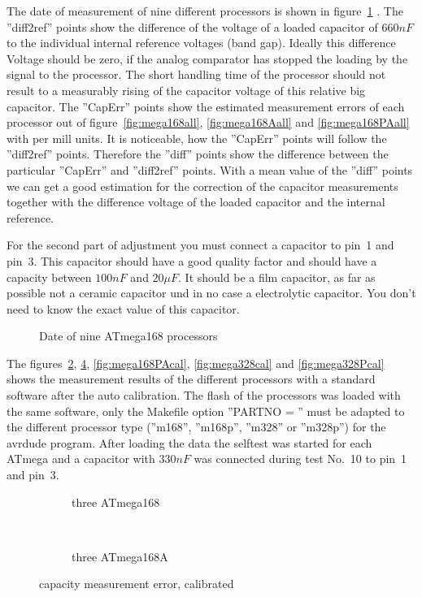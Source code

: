 The date of measurement of nine different processors is shown in figure~\ref{fig:CompAdjust} .
The ''diff2ref'' points show the difference of the voltage of a loaded capacitor of \(660 nF\) to the
individual internal reference voltages (band gap).
Ideally this difference Voltage should be zero, if the analog comparator has stopped the loading by the signal to
the processor. The short handling time of the processor should not result to a measurably rising of the 
capacitor voltage of this relative big capacitor.
The ''CapErr'' points show the estimated measurement errors of each processor out of figure~\ref{fig:mega168all}, \ref{fig:mega168Aall} 
and \ref{fig:mega168PAall} with per mill units.
It is noticeable, how the ''CapErr'' points will follow the ''diff2ref'' points.
Therefore the ''diff'' points show the difference between the particular ''CapErr'' and ''diff2ref'' points.
With a mean value of the ''diff'' points we can get a good estimation for the correction of the capacitor
measurements together with the difference voltage of the loaded capacitor and the internal reference.

For the second part of adjustment you must connect a capacitor to pin~1 and pin~3. This capacitor should have
a good quality factor and should have a capacity between \(100 nF\) and \(20 \mu F\).
It should be a film capacitor, as far as possible not a ceramic capacitor und in no case a electrolytic capacitor.
You don't need to know the exact value of this capacitor.

\begin{figure}[H]
\centering

\caption{Date of nine ATmega168 processors}
\label{fig:CompAdjust}
\end{figure}

The figures~\ref{fig:mega168cal}, \ref{fig:mega168Acal}, \ref{fig:mega168PAcal}, \ref{fig:mega328cal} and \ref{fig:mega328Pcal}
 shows the measurement results
of the different processors with a standard software after the auto calibration.
The flash of the processors was loaded with the same software, only the Makefile  option ''PARTNO = '' must be
adapted to the different processor type (''m168'', ''m168p'', ''m328'' or ''m328p'') for the avrdude program.
After loading the data the selftest was started for each ATmega and a capacitor with \(330 nF\) was connected
during test No.~10 to pin~1 and pin~3.

\begin{figure}[H]
  \begin{subfigure}[b]{9cm}
    \centering
    \resizebox{9cm}{!}{}
    \caption{three ATmega168}
    \label{fig:mega168cal}
  \end{subfigure}
  ~
  \begin{subfigure}[b]{9cm}
    \centering
    \resizebox{9cm}{!}{}
    \caption{three ATmega168A}
    \label{fig:mega168Acal}
  \end{subfigure}
  \caption{capacity measurement error, calibrated}
\end{figure}

